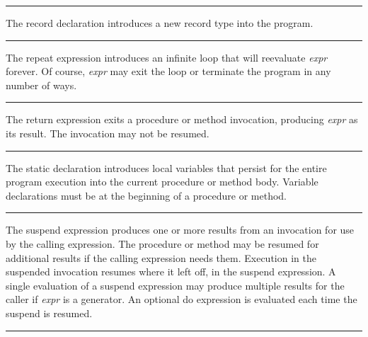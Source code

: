 \bigskip\hrule\vspace{0.1cm}

\noindent
{}The \textsf{record} declaration introduces a new record
type into the program.

\bigskip\hrule\vspace{0.1cm}

\noindent
{}The \textsf{repeat} expression
introduces an infinite loop that will reevaluate \textit{expr} forever.
Of course, \textit{expr} may exit the loop or terminate the program in
any number of ways.

\bigskip\hrule\vspace{0.1cm}

\noindent
{}The \textsf{return} expression exits a procedure or method
invocation, producing \textit{expr} as its result. The invocation may
not be resumed.

\bigskip\hrule\vspace{0.1cm}

\noindent
{}The \textsf{static} declaration introduces 
local variables that persist for the entire program execution
into the current procedure or method body. Variable
declarations must be at the beginning of a procedure or method.

\bigskip\hrule\vspace{0.1cm}

\noindent
{}The \textsf{suspend} expression produces one or more
results from an invocation for use by the calling expression. The
procedure or method may be resumed for additional results if the
calling expression needs them. Execution in the suspended invocation
resumes where it left off, in the \textsf{suspend} expression. A single
evaluation of a \textsf{suspend} expression may produce multiple
results for the caller if \textit{expr} is a
generator. An optional \textsf{do} expression is
evaluated each time the \textsf{suspend} is resumed.

\bigskip\hrule\vspace{0.1cm}

